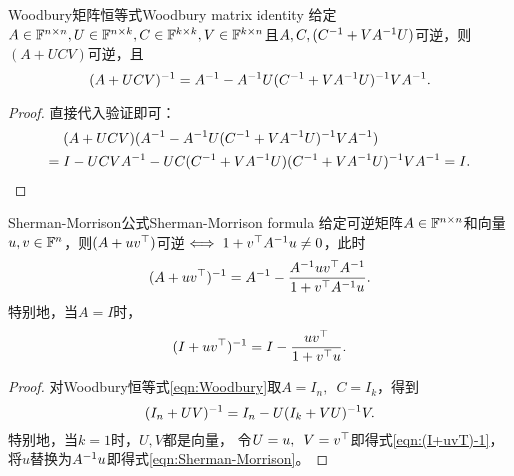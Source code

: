 
\begin{theorem}
	{Woodbury矩阵恒等式}{Woodbury matrix identity}
	给定$A\in\mathbb F^{n\times n},U\in\mathbb F^{n\times k},C\in\mathbb F^{k\times k},V\in\mathbb F^{k\times n}$且$A,C,(C^{-1}+VA^{-1} U)$可逆，则$(A+UCV)$可逆，且 
	\begin{equation}
		\label{eqn:Woodbury}
		(A+UCV)^{-1}=A^{-1}-A^{-1} U(C^{-1}+VA^{-1} U)^{-1} VA^{-1}.
	\end{equation}
\end{theorem}
\begin{proof}
	直接代入验证即可：
	\begin{align*}
		&(A+UCV)(A^{-1}-A^{-1} U(C^{-1}+VA^{-1} U)^{-1} VA^{-1})\\
		={}&I-UCVA^{-1}-UC(C^{-1}+VA^{-1} U)(C^{-1}+VA^{-1} U)^{-1} VA^{-1}=I.
		\qedhere
	\end{align*}
\end{proof}

\begin{theorem}
	{Sherman-Morrison公式}{Sherman-Morrison formula}
	给定可逆矩阵$A\in\mathbb F^{n\times n}$和向量$u,v\in\mathbb F^n$，则$(A+uv^\top)$可逆$\iff 1+v^\top A^{-1} u\neq 0$，此时
	\begin{equation}
		\label{eqn:Sherman-Morrison}
		(A+uv^\top)^{-1}=A^{-1}-\frac{A^{-1} uv^\top A^{-1}}{1+v^\top A^{-1} u}.
	\end{equation}
	特别地，当$A=I$时，
	\begin{equation}
		\label{eqn:(I+uvT)-1}
		(I+uv^\top)^{-1}=I-\frac{uv^\top}{1+v^\top u}.
	\end{equation}
\end{theorem}
\begin{proof}
	对Woodbury恒等式\eqref{eqn:Woodbury}取$A=I_n,\enspace C=I_k$，得到
	\begin{equation}
		\label{eqn:(I-uvT)-1}
		(I_n+UV)^{-1}=I_n-U(I_k+VU)^{-1} V.
	\end{equation}
	特别地，当$k=1$时，$U,V$都是向量，
	令$U=u,\enspace V=v^\top$即得式\eqref{eqn:(I+uvT)-1}，将$u$替换为$A^{-1} u$即得式\eqref{eqn:Sherman-Morrison}。
\end{proof}

